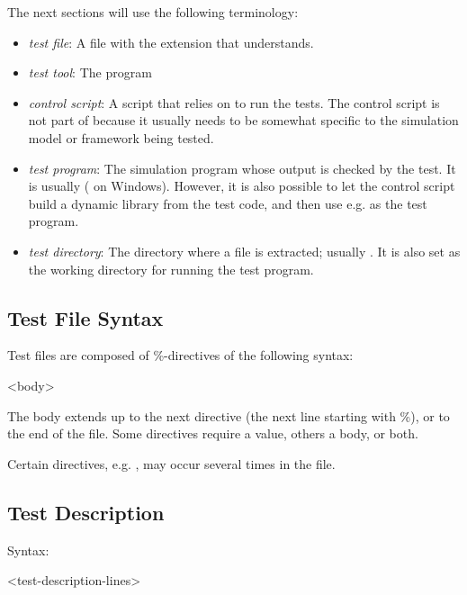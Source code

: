 The next sections will use the following terminology:

\begin{itemize}
\item \textit{test file}: A file with the  extension that  understands.
\item \textit{test tool}: The  program
\item \textit{control script}: A script that relies on  to run the tests.
  The control script is not part of {\opp} because it usually needs to be somewhat
  specific to the simulation model or framework being tested.
\item \textit{test program}: The simulation program whose output is checked by the test.
  It is usually  ( on Windows). However, it is
  also possible to let the control script build a dynamic library from the test code, and
  then use e.g.  as the test program.
\item \textit{test directory}: The directory where a  file
  is extracted; usually . It is also set as the working
  directory for running the test program.
\end{itemize}


\subsection{Test File Syntax}
\label{sec:testing:opptest:test-file-syntax}

Test files are composed of \%-directives of the following syntax:

\begin{filelisting}
<body>
\end{filelisting}

The body extends up to the next directive (the next line starting with \%),
or to the end of the file. Some directives require a value, others a body, or both.

Certain directives, e.g. , may occur several times in the file.

\subsection{Test Description}
\label{sec:testing:opptest:test-description}

Syntax:
\begin{filelisting}
<test-description-lines>
\end{filelisting}

